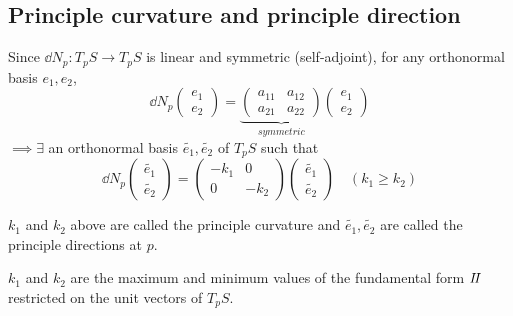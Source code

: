 \subsection{Principle curvature and principle direction}
Since \(\dd N_p\colon T_p S\to T_p S\) is linear and 
symmetric (self-adjoint), for any orthonormal basis {\(e_1,e_2\)},
\[
        \dd N_p\begin{pmatrix}
            e_1\\
            e_2
        \end{pmatrix}
        =\underbrace{\begin{pmatrix}
            a_{11}&a_{12}\\
            a_{21}&a_{22}
        \end{pmatrix}}_{symmetric}
        \begin{pmatrix}
            e_1\\
            e_2
        \end{pmatrix}
\]
\(\implies \exists\) an orthonormal basis {\(\tilde{e_1}
,\tilde{e_2}\)} of \(T_p S\) such that 
\[
        \dd{N}_p \begin{pmatrix}
            \tilde{e_1}\\
            \tilde{e_2}
        \end{pmatrix}
        =\begin{pmatrix}
            -k_1& 0\\
            0&-k_2
        \end{pmatrix}\begin{pmatrix}
            \tilde{e_1}\\
            \tilde{e_2}
        \end{pmatrix}
        \quad (k_1\ge k_2)
\]
\begin{definition}
    \(k_1\) and \(k_2\) above are called the principle curvature
    and \(\tilde{e_1},\tilde{e_2}\) are called the principle
    directions at \(p\).
\end{definition}
\begin{remark}
    \(k_1\) and \(k_2\) are the maximum and minimum values of 
    the  fundamental form \(I\!I\) restricted on 
    the unit vectors of \(T_p S\).
\end{remark}
